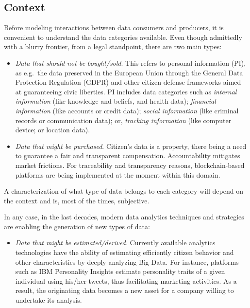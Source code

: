 


\subsection{Context}
Before modeling interactions between data consumers and producers, it is convenient to understand the data categories available. 
Even though admittedly with a blurry frontier, 
from a legal standpoint, there are two main types:

\begin{itemize}
\item {\em Data that should not be bought/sold}. This refers to  
 personal information (PI), as e.g.\ the data preserved in the European
 Union through 
 the General 
 Data Protection Regulation (GDPR) \parencite{gdpr} and other citizen defense frameworks
 aimed at guaranteeing civic liberties. PI includes 
 data categories such as 
{\em internal information} (like knowledge and beliefs, %
 and health %
 data); 
{\em financial information} (like accounts or %
 credit data);
{\em social information} (like %
criminal records %
or communication data); or,
{\em tracking information} (like computer device; 
or location data).
%
\item {\em Data that might be purchased}. Citizen’s data is a property,
there being a need to guarantee a fair and transparent compensation.
Accountability mitigates market frictions. For
traceability and transparency reasons,
blockchain-based platforms are being implemented at the moment within this domain.
\end{itemize}
  A characterization of what type of data 
  belongs to each category will depend on the context and is, most of the times, subjective.

In any case, in the last decades, modern data analytics techniques and strategies are enabling the generation of new types of data:
\begin{itemize}
\item {\em Data that might be estimated/derived.}  Currently available analytics technologies have the ability of estimating efficiently citizen behavior and other characteristics by deeply analyzing Big Data. For instance, platforms such as IBM Personality Insights \parencite{ibm} estimate personality traits of a
given individual using his/her tweets, thus facilitating marketing activities.
As a result, the originating data becomes a new asset for a company
willing to undertake its analysis.
\end{itemize}

